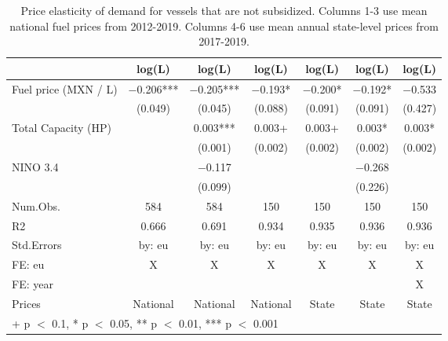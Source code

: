 \begin{table}

\caption{\label{tab:}Price elasticity of demand for vessels that are not subsidized.
             Columns 1-3 use mean national fuel prices from 2012-2019.
             Columns 4-6 use mean annual state-level prices from 2017-2019.}
\centering
\begin{tabular}[t]{lcccccc}
\toprule
  & log(L) & log(L)  & log(L)   & log(L)    & log(L)     & log(L)     \\
\midrule
Fuel price (MXN / L) & \num{-0.206}*** & \num{-0.205}*** & \num{-0.193}* & \num{-0.200}* & \num{-0.192}* & \num{-0.533}\\
 & (\num{0.049}) & (\num{0.045}) & (\num{0.088}) & (\num{0.091}) & (\num{0.091}) & (\num{0.427})\\
Total Capacity (HP) &  & \num{0.003}*** & \num{0.003}+ & \num{0.003}+ & \num{0.003}* & \num{0.003}*\\
 &  & (\num{0.001}) & (\num{0.002}) & (\num{0.002}) & (\num{0.002}) & (\num{0.002})\\
NINO 3.4 &  & \num{-0.117} &  &  & \num{-0.268} & \\
 &  & (\num{0.099}) &  &  & (\num{0.226}) & \\
\midrule
Num.Obs. & \num{584} & \num{584} & \num{150} & \num{150} & \num{150} & \num{150}\\
R2 & \num{0.666} & \num{0.691} & \num{0.934} & \num{0.935} & \num{0.936} & \num{0.936}\\
Std.Errors & by: eu & by: eu & by: eu & by: eu & by: eu & by: eu\\
FE: eu & X & X & X & X & X & X\\
FE: year &  &  &  &  &  & X\\
Prices & National & National & National & State & State & State\\
\bottomrule
\multicolumn{7}{l}{\rule{0pt}{1em}+ p $<$ 0.1, * p $<$ 0.05, ** p $<$ 0.01, *** p $<$ 0.001}\\
\end{tabular}
\end{table}
